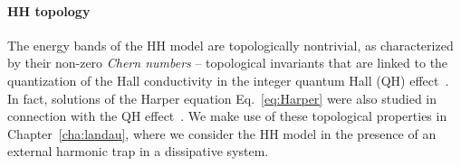 \paragraph{HH topology}
The energy bands of the HH model are topologically nontrivial, as
characterized by their non-zero \textit{Chern numbers} -- topological
invariants that are linked to the quantization of the Hall
conductivity in the integer quantum Hall (QH)
effect~\cite{thouless}. In fact, solutions of the Harper equation
Eq.~\eqref{eq:Harper} were also studied in connection with the QH
effect~\cite{PhysRevB.39.11943}. We make use of these topological
properties in Chapter~\ref{cha:landau}, where we consider the HH model
in the presence of an external harmonic trap in a dissipative system.


\begin{subappendices}

\end{subappendices}
